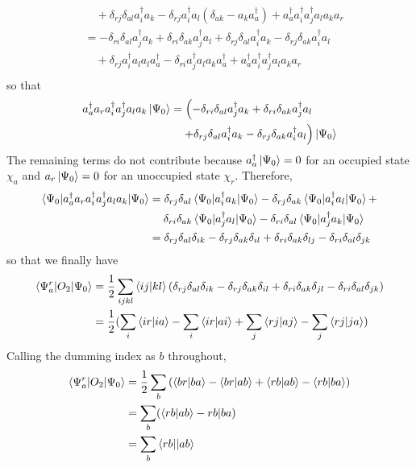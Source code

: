 \begin{enumerate}
\[\begin{aligned}
&\quad + \delta_{rj}\delta_{al}a_i^\dagger a_k - \delta_{rj}a_i^\dagger a_l(
\delta_{ak} - a_ka_a^\dagger)+ a_a^\dagger a_i^\dagger a_j^\dagger a_la_ka_r \\
&= -\delta_{ri}\delta_{al}a_j^\dagger a_k + \delta_{ri}\delta_{ak}a_j^\dagger a_l
+ \delta_{rj}\delta_{al}a_i^\dagger a_k - \delta_{rj}\delta_{ak}a_i^\dagger a_l\\
&\quad + \delta_{rj}a_i^\dagger a_l a_l a_a^\dagger - \delta_{ri}a_j^\dagger 
a_la_k a_a^\dagger + a_a^\dagger a_i^\dagger a_j^\dagger a_la_ka_r \\
\end{aligned}
\]
so that
\[
\begin{aligned}
a_a^\dagger a_r a_i^\dagger a_j^\dagger a_l a_k\ket{\Psi_0} &= \left( 
-\delta_{ri}\delta_{al}a_j^\dagger a_k + \delta_{ri}\delta_{ak}a_j^\dagger a_l
\right. \\
&\quad\left. + \delta_{rj}\delta_{al}a_i^\dagger a_k - \delta_{rj}\delta_{ak}
a_i^\dagger a_l\right)\ket{\Psi_0}
\end{aligned}
\]
The remaining terms do not contribute because $a_a^\dagger\ket{\Psi_0} = 0$
for an occupied state $\chi_a$ and $a_r\ket{\Psi_0} = 0$ for an unoccupied
state $\chi_r$. Therefore,
\[
\begin{aligned}
\braket{\Psi_0|a_a^\dagger a_r a_i^\dagger a_j^\dagger a_l a_k|\Psi_0} &= 
\delta_{rj}\delta_{al}\braket{\Psi_0|a_i^\dagger a_k|\Psi_0} - 
\delta_{rj}\delta_{ak}\braket{\Psi_0|a_i^\dagger a_l|\Psi_0} + \\
&\quad\; \delta_{ri}\delta_{ak}\braket{\Psi_0|a_j^\dagger a_l|\Psi_0} -
\delta_{ri}\delta_{al}\braket{\Psi_0|a_j^\dagger a_k|\Psi_0} \\
&= \delta_{rj}\delta_{al}\delta_{ik} - \delta_{rj}\delta_{ak}\delta_{il} +
\delta_{ri}\delta_{ak}\delta_{lj} - \delta_{ri}\delta_{al}\delta_{jk}
\end{aligned}
\]
so that we finally have
\[
\begin{aligned}
\braket{\Psi_a^r|O_2|\Psi_0} &= \frac{1}{2}\sum_{ijkl}\braket{ij|kl}(
\delta_{rj}\delta_{al}\delta_{ik} - \delta_{rj}\delta_{ak}\delta_{il} +
\delta_{ri}\delta_{ak}\delta_{jl} - \delta_{ri}\delta_{al}\delta_{jk}) \\
&= \frac{1}{2}(\sum_i\braket{ir|ia} - \sum_i\braket{ir|ai} + 
   \sum_j\braket{rj|aj} - \sum_j\braket{rj|ja})
\end{aligned}
\]
Calling the dumming index as $b$ throughout,
\[
\begin{aligned}
\braket{\Psi_a^r|O_2|\Psi_0} &= \frac{1}{2}\sum_b\left(\braket{br|ba} - 
\braket{br|ab} + \braket{rb|ab} - \braket{rb|ba}\right) \\
 &= \sum_b(\braket{rb|ab} - {rb|ba}) \\
 &= \sum_b\braket{rb||ab}
\end{aligned}
\]


\end{enumerate}
